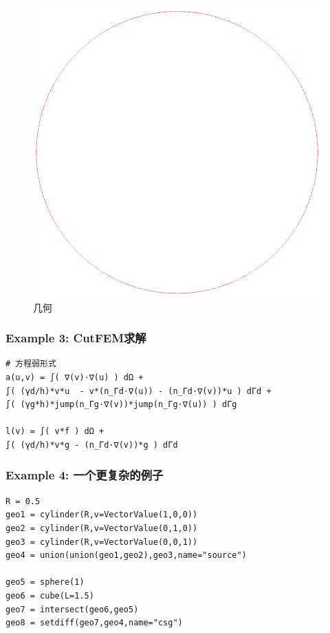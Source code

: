 \documentclass[lang=en,aspectratio=43,theme=default,logo=on]{simplebeamer}
\begin{document}
\begin{frame}[fragile]
\begin{figure}
\begin{minipage}[t]{0.5\linewidth}
            \includegraphics[height=0.5\textheight]{./img/010.png}
            \caption{几何}
        \end{minipage}
    \end{figure}
\end{frame}

\begin{frame}[fragile]
    \frametitle{Example 3: CutFEM求解}
    \begin{verbatim}
# 方程弱形式
a(u,v) = ∫( ∇(v)⋅∇(u) ) dΩ +
∫( (γd/h)*v*u  - v*(n_Γd⋅∇(u)) - (n_Γd⋅∇(v))*u ) dΓd +
∫( (γg*h)*jump(n_Γg⋅∇(v))*jump(n_Γg⋅∇(u)) ) dΓg

l(v) = ∫( v*f ) dΩ +
∫( (γd/h)*v*g - (n_Γd⋅∇(v))*g ) dΓd
    \end{verbatim}
\end{frame}

\begin{frame}[fragile]
    \frametitle{Example 4: 一个更复杂的例子}
    \begin{verbatim}
R = 0.5
geo1 = cylinder(R,v=VectorValue(1,0,0))
geo2 = cylinder(R,v=VectorValue(0,1,0))
geo3 = cylinder(R,v=VectorValue(0,0,1))
geo4 = union(union(geo1,geo2),geo3,name="source")

geo5 = sphere(1)
geo6 = cube(L=1.5)
geo7 = intersect(geo6,geo5)
geo8 = setdiff(geo7,geo4,name="csg")
    \end{verbatim}
\end{frame}
\end{document}
